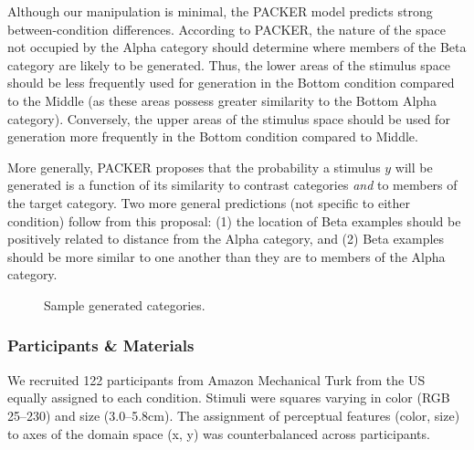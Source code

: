 \documentclass[10pt,letterpaper]{article}
\newcommand\inputpgf[2]{{
\let\pgfimageWithoutPath\pgfimage
\renewcommand{\pgfimage}[2][]{\pgfimageWithoutPath[##1]{#1/##2}}

}}
\begin{document}

Although our manipulation is minimal, the PACKER model predicts strong between-condition differences. According to PACKER, the nature of the space not occupied by the Alpha category should determine where members of the Beta category are likely to be generated. Thus, the lower areas of the stimulus space should be less frequently used for generation in the Bottom condition compared to the Middle (as these areas possess greater similarity to the Bottom Alpha category). Conversely, the upper areas of the stimulus space should be used for generation more frequently in the Bottom condition compared to Middle.


More generally, PACKER proposes that the probability a stimulus $y$ will be generated is a function of its similarity to contrast categories \textit{and} to members of the target category. Two more general predictions (not specific to either condition) follow from this proposal: (1) the location of Beta examples should be positively related to distance from the Alpha category, and (2) Beta examples should be more similar to one another than they are to members of the Alpha category.

\begin{figure}
    \begin{center}
    \inputpgf{figs/}{beta.samples.pgf}
    \caption{Sample generated categories. }
    \label{fig:beta.samples}
    \end{center}
\end{figure}

\subsubsection{Participants \& Materials}
We recruited 122 participants from Amazon Mechanical Turk from the US equally assigned to each condition. Stimuli were squares varying in color (RGB 25--230) and size (3.0--5.8cm). The assignment of perceptual features (color, size) to axes of the domain space (x, y) was counterbalanced across participants.
\end{document}
